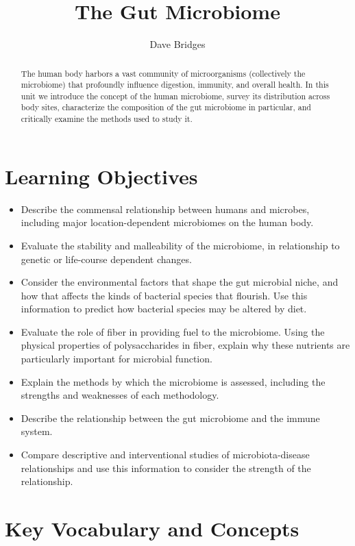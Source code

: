 \documentclass{tufte-handout}
\title{The Gut Microbiome}
\author{Dave Bridges}
\begin{document}
\maketitle

\begin{abstract}
The human body harbors a vast community of microorganisms (collectively the microbiome) that profoundly influence digestion, immunity, and overall health. In this unit we introduce the concept of the human microbiome, survey its distribution across body sites, characterize the composition of the gut microbiome in particular, and critically examine the methods used to study it.
\end{abstract}

\tableofcontents

\pagebreak

\section{Learning Objectives}

\begin{itemize}
  \item Describe the commensal relationship between humans and microbes, including major location-dependent microbiomes on the human body.
  \item Evaluate the stability and malleability of the microbiome, in relationship to genetic or life-course dependent changes.
  \item Consider the environmental factors that shape the gut microbial niche, and how that affects the kinds of bacterial species that flourish. Use this information to predict how bacterial species may be altered by diet.
  \item Evaluate the role of fiber in providing fuel to the microbiome. Using the physical properties of polysaccharides in fiber, explain why these nutrients are particularly important for microbial function.
  \item Explain the methods by which the microbiome is assessed, including the strengths and weaknesses of each methodology.
  \item Describe the relationship between the gut microbiome and the immune system.
  \item Compare descriptive and interventional studies of microbiota-disease relationships and use this information to consider the strength of the relationship.
\end{itemize}

\section{Key Vocabulary and Concepts}
\end{document}
